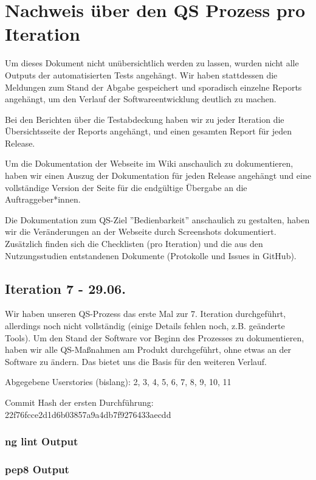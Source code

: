 \documentclass[accentcolor=tud0b,12pt,paper=a4]{tudreport}
\begin{document}
\chapter{Nachweis über den QS Prozess pro Iteration}
Um dieses Dokument nicht unübersichtlich werden zu lassen, wurden nicht alle Outputs der automatisierten Tests angehängt. Wir haben stattdessen die Meldungen zum Stand der Abgabe gespeichert und sporadisch einzelne Reports angehängt, um den Verlauf der Softwareentwicklung deutlich zu machen.

Bei den Berichten über die Testabdeckung haben wir zu jeder Iteration die Übersichtsseite der Reports angehängt, und einen gesamten Report für jeden Release.

Um die Dokumentation der Webseite im Wiki anschaulich zu dokumentieren, haben wir einen Auszug der Dokumentation für jeden Release angehängt und eine vollständige Version der Seite für die endgültige Übergabe an die Auftraggeber*innen.

Die Dokumentation zum QS-Ziel ''Bedienbarkeit'' anschaulich zu gestalten, haben wir die Veränderungen an der Webseite durch Screenshots dokumentiert. Zusätzlich finden sich die Checklisten (pro Iteration) und die aus den Nutzungsstudien entstandenen Dokumente (Protokolle und Issues in GitHub).


\section*{Iteration 7 - 29.06.}
	Wir haben unseren QS-Prozess das erste Mal zur 7. Iteration durchgeführt, allerdings noch nicht vollständig (einige Details fehlen noch, z.B. geänderte Tools). Um den Stand der Software vor Beginn des Prozesses zu dokumentieren, haben wir alle QS-Maßnahmen am Produkt durchgeführt, ohne etwas an der Software zu ändern. Das bietet uns die Basis für den weiteren Verlauf.
	
	Abgegebene Userstories (bislang): 2, 3, 4, 5, 6, 7, 8, 9, 10, 11
	
	Commit Hash der ersten Durchführung: 22f76fcce2d1d6b03857a9a4db7f9276433aecdd
	
	\subsection*{ng lint Output}
	
	
	\subsection*{pep8 Output}
	
	
\end{document}
